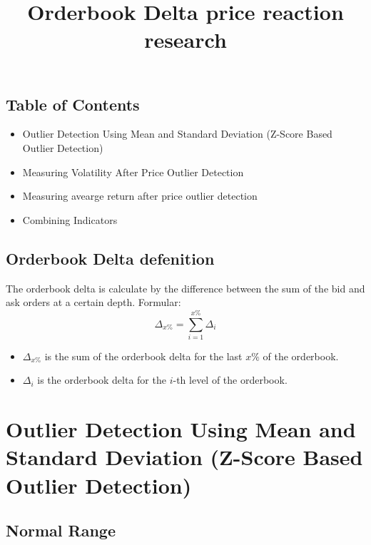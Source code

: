 \documentclass[12pt]{article}
\title{\Huge Orderbook Delta price reaction research}
\author{}
\date{}
\begin{document}
\maketitle


\subsection*{Table of Contents}

\begin{itemize}
  \item Outlier Detection Using Mean and Standard Deviation (Z-Score Based Outlier Detection)
  \item Measuring Volatility After Price Outlier Detection
  \item Measuring avearge return after price outlier detection
  \item Combining Indicators
\end{itemize}



\subsection*{Orderbook Delta defenition}
The orderbook delta is calculate by the difference between the sum of the bid and ask orders at a certain depth.
Formular:
\begin{equation*}
  \Delta_{x\%} = \sum_{i=1}^{x\%} \Delta_{i}
\end{equation*}

\begin{itemize}
  \item $\Delta_{x\%}$ is the sum of the orderbook delta for the last $x\%$ of the orderbook.
  \item $\Delta_{i}$ is the orderbook delta for the $i$-th level of the orderbook.
\end{itemize}






\newpage

\section*{Outlier Detection Using Mean and Standard Deviation (Z-Score Based Outlier Detection)}


\subsection*{Normal Range}
\end{document}
